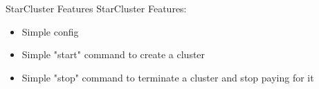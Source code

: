 \begin{frame}{StarCluster Features}
  StarCluster Features:
  \pause
  \begin{itemize}
    \item Simple config
    \item Simple "start" command to create a cluster
    \item Simple "stop" command to terminate a cluster and stop paying for it
  \end{itemize}
\end{frame}
